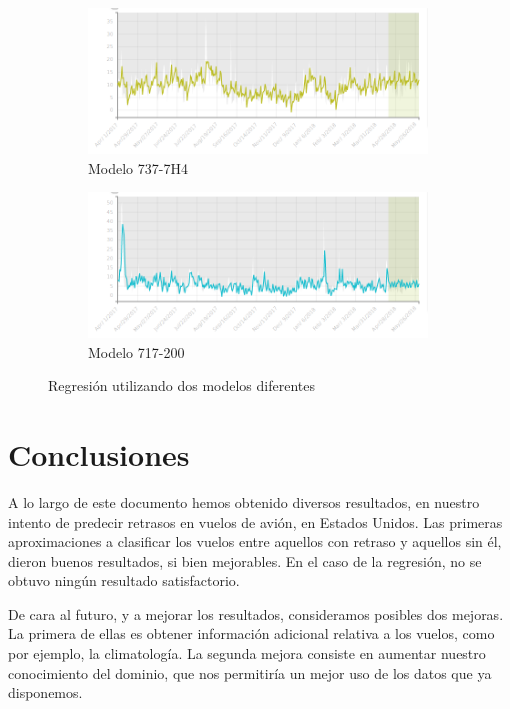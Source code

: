 \documentclass[format=acmsmall, review=false, screen=true]{acmart}
\begin{document}
\begin{figure}[bht]
	\centering
	\begin{subfigure}{\linewidth}
		\centering
		\includegraphics[width=9cm]{Regresion-737.png}
		\caption{Modelo 737-7H4}
		\label{fig:Regresion737_2}
	\end{subfigure}
	\begin{subfigure}{\linewidth}
		\centering
		\includegraphics[width=9cm]{Regresion-717.png}
		\caption{Modelo 717-200}
		\label{fig:Regresion717}
	\end{subfigure}
	\caption{Regresión utilizando dos modelos diferentes}
	\label{fig:Regresion_737_717}
\end{figure} 

\section{Conclusiones}

A lo largo de este documento hemos obtenido diversos resultados, en nuestro intento de predecir retrasos en vuelos de avión, en Estados Unidos. Las primeras aproximaciones a clasificar los vuelos entre aquellos con retraso y aquellos sin él, dieron buenos resultados, si bien mejorables. En el caso de la regresión, no se obtuvo ningún resultado satisfactorio.

De cara al futuro, y a mejorar los resultados, consideramos posibles dos mejoras. La primera de ellas es obtener información adicional relativa a los vuelos, como por ejemplo, la climatología. La segunda mejora consiste en aumentar nuestro conocimiento del dominio, que nos permitiría un mejor uso de los datos que ya disponemos.
\end{document}
